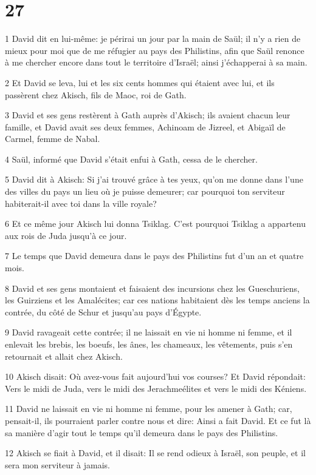 \chapter{27}

\par 1 David dit en lui-même: je périrai un jour par la main de Saül; il n'y a rien de mieux pour moi que de me réfugier au pays des Philistins, afin que Saül renonce à me chercher encore dans tout le territoire d'Israël; ainsi j'échapperai à sa main.
\par 2 Et David se leva, lui et les six cents hommes qui étaient avec lui, et ils passèrent chez Akisch, fils de Maoc, roi de Gath.
\par 3 David et ses gens restèrent à Gath auprès d'Akisch; ils avaient chacun leur famille, et David avait ses deux femmes, Achinoam de Jizreel, et Abigaïl de Carmel, femme de Nabal.
\par 4 Saül, informé que David s'était enfui à Gath, cessa de le chercher.
\par 5 David dit à Akisch: Si j'ai trouvé grâce à tes yeux, qu'on me donne dans l'une des villes du pays un lieu où je puisse demeurer; car pourquoi ton serviteur habiterait-il avec toi dans la ville royale?
\par 6 Et ce même jour Akisch lui donna Tsiklag. C'est pourquoi Tsiklag a appartenu aux rois de Juda jusqu'à ce jour.
\par 7 Le temps que David demeura dans le pays des Philistins fut d'un an et quatre mois.
\par 8 David et ses gens montaient et faisaient des incursions chez les Gueschuriens, les Guirziens et les Amalécites; car ces nations habitaient dès les temps anciens la contrée, du côté de Schur et jusqu'au pays d'Égypte.
\par 9 David ravageait cette contrée; il ne laissait en vie ni homme ni femme, et il enlevait les brebis, les boeufs, les ânes, les chameaux, les vêtements, puis s'en retournait et allait chez Akisch.
\par 10 Akisch disait: Où avez-vous fait aujourd'hui vos courses? Et David répondait: Vers le midi de Juda, vers le midi des Jerachmeélites et vers le midi des Kéniens.
\par 11 David ne laissait en vie ni homme ni femme, pour les amener à Gath; car, pensait-il, ils pourraient parler contre nous et dire: Ainsi a fait David. Et ce fut là sa manière d'agir tout le temps qu'il demeura dans le pays des Philistins.
\par 12 Akisch se fiait à David, et il disait: Il se rend odieux à Israël, son peuple, et il sera mon serviteur à jamais.

